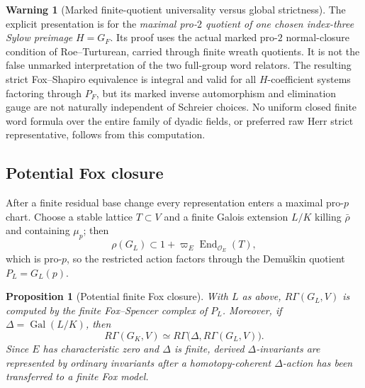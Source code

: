 \documentclass[11pt]{article}
\newtheorem{proposition}[theorem]{Proposition}
\theoremstyle{definition}
\newtheorem{warning}[theorem]{Warning}
\newcommand{\End}{\operatorname{End}}
\newcommand{\Gal}{\operatorname{Gal}}
\begin{document}
\begin{warning}[Marked finite-quotient universality versus global strictness]
\label{warn:dyadic-f133-pro2-marked-scope}
The explicit
presentation is
for the
\emph{maximal
pro-$2$ quotient
of one chosen
index-three
Sylow preimage}
$H=G_F$.
Its proof uses
the actual
marked pro-$2$
normal-closure
condition of
Roe--Turturean,
carried through
finite wreath
quotients.
It is not
the false
unmarked
interpretation
of the two
full-group
word relators.
The resulting
strict
Fox--Shapiro
equivalence is
integral and
valid for
all $H$-coefficient
systems
factoring
through $P_F$,
but its marked
inverse automorphism
and elimination
gauge are
not naturally
independent
of Schreier
choices.
No uniform
closed finite
word formula
over the
entire
family of
dyadic fields,
or preferred
raw Herr
strict
representative,
follows from
this computation.
\end{warning}

\subsection{Potential Fox closure}

After a finite residual base change every representation enters a maximal pro-$p$ chart.  Choose a stable lattice $T\subset V$ and a finite Galois extension $L/K$ killing $\bar\rho$ and containing $\mu_p$; then
\[
\rho(G_L)\subset 1+\varpi_E\End_{\mathcal O_E}(T),
\]
which is pro-$p$, so the restricted action factors through the Demu\v{s}kin quotient $P_L=G_L(p)$.

\begin{proposition}[Potential finite Fox closure]\label{prop:potential-fox-closure}
With $L$ as above, $R\Gamma(G_L,V)$ is computed by the finite Fox--Spencer complex of $P_L$.  Moreover, if $\Delta=\Gal(L/K)$, then
\[
R\Gamma(G_K,V)
\simeq
R\Gamma\bigl(\Delta,R\Gamma(G_L,V)\bigr).
\]
Since $E$ has characteristic zero and $\Delta$ is finite, derived $\Delta$-invariants are represented by ordinary invariants after a homotopy-coherent $\Delta$-action has been transferred to a finite Fox model.
\end{proposition}
\end{document}
